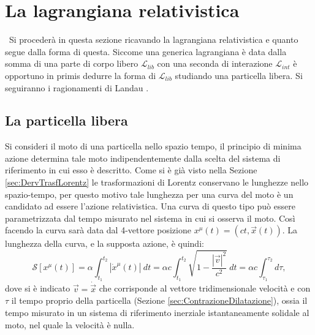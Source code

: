 \section{La lagrangiana relativistica}\
Si procederà in questa sezione ricavando la lagrangiana relativistica e quanto segue dalla forma di questa. Siccome una generica lagrangiana è data dalla somma di una parte di corpo libero $\mathcal{L}_{lib}$ con una seconda di interazione $\mathcal{L}_{int}$ è opportuno in primis dedurre la forma di $\mathcal{L}_{lib}$ studiando una particella libera. Si seguiranno i ragionamenti di Landau \cite{Landau}.
\subsection{La particella libera}
Si consideri il moto di una particella nello spazio tempo, il principio di minima azione determina tale moto indipendentemente dalla scelta del sistema di riferimento in cui esso è descritto.
Come si è già visto nella Sezione \ref{sec:DervTrasfLorentz} le trasformazioni di Lorentz conservano le lunghezze nello spazio-tempo, per questo motivo tale lunghezza per una curva del moto è un candidato ad essere l'azione relativistica. Una curva di questo tipo può essere parametrizzata dal tempo misurato nel sistema in cui si osserva il moto. Così facendo la curva sarà data dal 4-vettore posizione $x^\mu(t)=(ct,\vec{x}(t))$. La lunghezza della curva, e la supposta azione, è quindi:
\begin{equation}
    \label{azioneRel}
    \mathcal{S}[x^\mu(t)]=\alpha\int_{t_1}^{t_2} |\dot{x}^\mu(t)|\ dt= \alpha c\int_{t_1}^{t_2} \sqrt{1-\frac{|\vec{v}|^2}{c^2}}\ dt=\alpha c\int_{\tau_1}^{\tau_2}d\tau,
\end{equation}
dove si è indicato $\vec{v}=\dot{\vec{x}}$ che corrisponde al vettore tridimensionale velocità e con $\tau$ il tempo proprio della particella (Sezione \ref{sec:ContrazioneDilatazione}), ossia il tempo misurato in un sistema di riferimento inerziale istantaneamente solidale al moto, nel quale la velocità è nulla.\\

